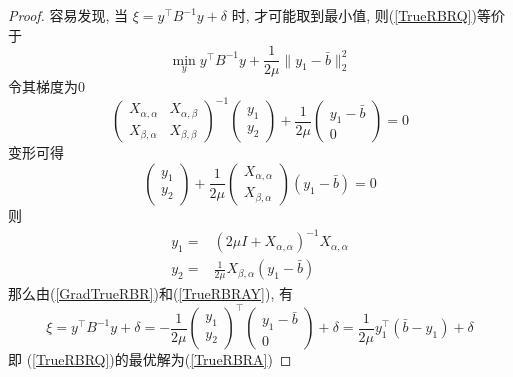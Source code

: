 \documentclass[a4paper, UTF8]{ctexart}				%
\numberwithin{equation}{section}				%
\newcommand{\upcite}[1]{\textsuperscript{\textsuperscript{\cite{#1}}}}
\begin{document}
			\begin{proof}\upcite{wen2009row}
				容易发现, 当 $\xi = y^\top B^{-1}y + \delta$ 时, 才可能取到最小值, 则(\ref{TrueRBRQ})等价于
				\begin{equation}
					\min_y y^\top B^{-1}y + \frac{1}{2\mu} \lVert{y_1-\bar{b}}\rVert^2_2
				\end{equation}
				令其梯度为0
				\begin{equation}\label{GradTrueRBR}
						{\begin{pmatrix}
							X_{\alpha, \alpha} & X_{\alpha, \beta}\\
							X_{\beta, \alpha} & X_{\beta, \beta}
						\end{pmatrix}}^{-1}
						\begin{pmatrix}
							y_1 \\ y_2
						\end{pmatrix}
					+	\frac{1}{2\mu}
						\begin{pmatrix}
							y_1 - \bar{b} \\ 0
						\end{pmatrix}
					=	0
				\end{equation}
				变形可得 
				\begin{equation}
						\begin{pmatrix}
							y_1 \\ y_2
						\end{pmatrix}
					+	\frac{1}{2\mu}
						\begin{pmatrix}
							X_{\alpha, \alpha} \\ X_{\beta, \alpha}
						\end{pmatrix}
						(y_1 - \bar{b})
					=	0
				\end{equation}
				则 
				\begin{equation}
					\begin{split}\label{TrueRBRAY}
						y_1 =
							& (2 \mu I + X_{\alpha, \alpha})^{-1} X_{\alpha, \alpha}\\
						y_2 =
							& \frac{1}{2\mu} X_{\beta, \alpha} (y_1 - \bar{b})
					\end{split}
				\end{equation}
				那么由(\ref{GradTrueRBR})和(\ref{TrueRBRAY}), 有
				\begin{equation}\label{TrueRBRAXi}
						\xi
					=	y^\top B^{-1}y + \delta
					= 	- \frac{1}{2\mu}
						\begin{pmatrix}
							y_1 \\ y_2
						\end{pmatrix}^\top
						\begin{pmatrix}
							y_1 - \bar{b} \\ 0
						\end{pmatrix}
						+ \delta
					=	\frac{1}{2 \mu} y_1^\top (\bar{b} - y_1) + \delta
				\end{equation}
				即 (\ref{TrueRBRQ})的最优解为(\ref{TrueRBRA})
			\end{proof}
			
\end{document}
